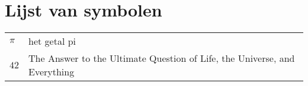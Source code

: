 
\chapter*{Lijst van symbolen}

\begin{center}
  \begin{tabularx}{0.8\textwidth}{p{1.5cm}X}
    $\pi$ & het getal pi\\
    $42$  & The Answer to the Ultimate Question of Life, the Universe, and Everything\cite{h2g2}
  \end{tabularx}
\end{center}
